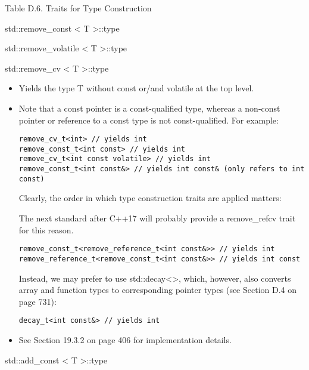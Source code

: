 \begin{center}
Table D.6. Traits for Type Construction
\end{center}

std::remove\_const < T >::type

std::remove\_volatile < T >::type

std::remove\_cv < T >::type

\begin{itemize}
\item
Yields the type T without const or/and volatile at the top level.

\item
Note that a const pointer is a const-qualified type, whereas a non-const pointer or reference to a const type is not const-qualified. For example:

\begin{lstlisting}[style=styleCXX]
remove_cv_t<int> // yields int
remove_const_t<int const> // yields int
remove_cv_t<int const volatile> // yields int
remove_const_t<int const&> // yields int const& (only refers to int const)
\end{lstlisting}

Clearly, the order in which type construction traits are applied matters:

\begin{tcolorbox}[colback=webgreen!5!white,colframe=webgreen!75!black]
\hspace*{0.75cm}The next standard after C++17 will probably provide a remove\_refcv trait for this reason.
\end{tcolorbox}

\begin{lstlisting}[style=styleCXX]
remove_const_t<remove_reference_t<int const&>> // yields int
remove_reference_t<remove_const_t<int const&>> // yields int const
\end{lstlisting}

Instead, we may prefer to use std::decay<>, which, however, also converts array and function types to corresponding pointer types (see Section D.4 on page 731):

\begin{lstlisting}[style=styleCXX]
decay_t<int const&> // yields int
\end{lstlisting}

\item
See Section 19.3.2 on page 406 for implementation details.
\end{itemize}

std::add\_const < T >::type

